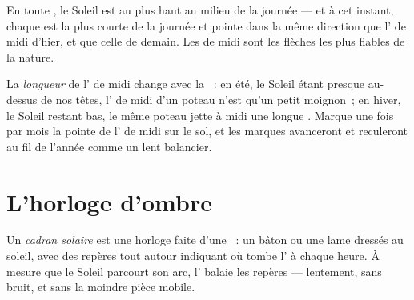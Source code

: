 \begin{proposition}\label{prop:g3:sun-days-seasons:midday}
En toute , le Soleil est au plus haut au milieu de la journée
--- et à cet instant, chaque  est la plus courte de la journée
et pointe dans la même direction que l' de midi d'hier, et que
celle de demain. Les  de midi sont les flèches les plus fiables
de la nature.
\end{proposition}

\begin{example}\label{ex:g3:sun-days-seasons:shadowlength}
La \emph{longueur} de l' de midi change avec la ~: en été,
le Soleil étant presque au-dessus de nos têtes, l' de midi d'un
poteau n'est qu'un petit moignon~; en hiver, le Soleil restant bas,
le même poteau jette à midi une longue . Marque une fois par
mois la pointe de l' de midi sur le sol, et les marques
avanceront et reculeront au fil de l'année comme un lent balancier.
\end{example}

\section{L'horloge d'ombre}

\begin{definition}\label{def:g3:sun-days-seasons:sundial}
Un \emph{cadran solaire} est une horloge faite
d'une ~: un bâton ou une lame dressés au soleil, avec des
repères tout autour indiquant où tombe l' à chaque heure. À
mesure que le Soleil parcourt son arc, l' balaie les repères ---
lentement, sans bruit, et sans la moindre pièce mobile.
\end{definition}

